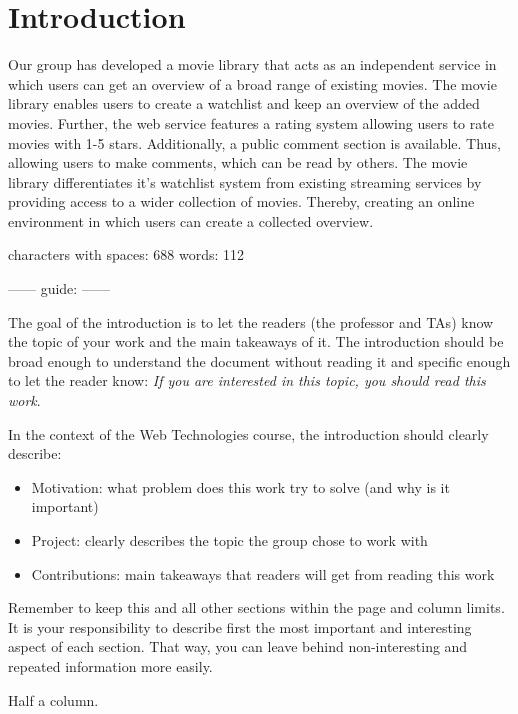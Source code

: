 \section{Introduction}

Our group has developed a movie library that acts as an independent service in which users can get an overview of a broad range of existing movies. The movie library enables users to create a watchlist and keep an overview of the added movies. Further, the web service features a rating system allowing users to rate movies with 1-5 stars. Additionally, a public comment section is available. Thus, allowing users to make comments, which can be read by others.\newline
The movie library differentiates it's watchlist system from existing streaming services by providing access to a wider collection of movies. Thereby, creating an online environment in which users can create a collected overview.

characters with spaces: 688
words: 112

------ guide: ------

\noindent The goal of the introduction is to let the readers (the professor and TAs) know the topic of your work and the main takeaways of it.
The introduction should be broad enough to understand the document without reading it and specific enough to let the reader know: \textit{If you are interested in this topic, you should read this work}.

\noindent In the context of the Web Technologies course, the introduction should clearly describe:

\begin{itemize}
    \item Motivation: what problem does this work try to solve (and why is it important)
    \item Project: clearly describes the topic the group chose to work with
    \item Contributions: main takeaways that readers will get from reading this work
\end{itemize}


\noindent Remember to keep this and all other sections within the page and column limits.
It is your responsibility to describe first the most important and interesting aspect of each section.
That way, you can leave behind non-interesting and repeated information more easily.

 Half a column.
